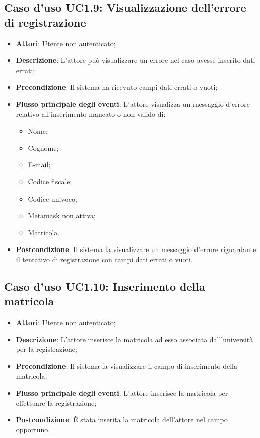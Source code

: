 \subsection{Caso d'uso \texorpdfstring{UC1.9}{UC1.9}: Visualizzazione dell'errore di registrazione}
\begin{itemize}
	\item \textbf{Attori}: Utente non autenticato;
	\item \textbf{Descrizione}: L'attore può visualizzare un errore nel caso avesse inserito dati errati;
	\item \textbf{Precondizione}: Il sistema ha ricevuto campi dati errati o vuoti;
	\item \textbf{Flusso principale degli eventi}: L'attore visualizza un messaggio d'errore relativo all'inserimento mancato o non valido di:
	\begin{itemize}
		\item Nome;
		\item Cognome;
		\item E-mail;
		\item Codice fiscale;
		\item Codice univoco;
		\item Metamask non attiva;
		\item Matricola.
	\end{itemize}
	\item \textbf{Postcondizione}: Il sistema fa visualizzare un messaggio d'errore riguardante il tentativo di registrazione con campi dati errati o vuoti.
\end{itemize}
\subsection{Caso d'uso \texorpdfstring{UC1.10}{UC1.10}: Inserimento della matricola}
\begin{itemize}
	\item \textbf{Attori}: Utente non autenticato;
	\item \textbf{Descrizione}: L'attore inserisce la matricola ad esso associata dall'università per la registrazione;
	\item \textbf{Precondizione}: Il sistema fa visualizzare il campo di inserimento della matricola;
	\item \textbf{Flusso principale degli eventi}: L'attore inserisce la matricola per effettuare la registrazione;
	\item \textbf{Postcondizione}: È stata inserita la matricola dell'attore nel campo opportuno.
\end{itemize}
